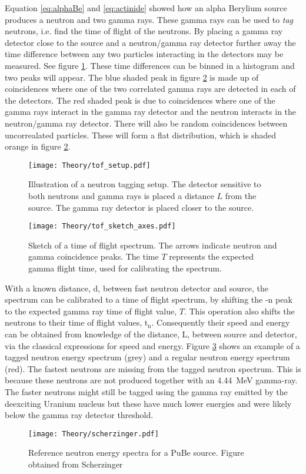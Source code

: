\documentclass[main.tex]{subfiles}
\begin{document}
Equation \ref{eq:alphaBe} and \ref{eq:actinide} showed how an alpha Berylium source produces a neutron and two gamma rays. These gamma rays can be used to \textit{tag} neutrons, i.e. find the time of flight of the neutrons. By placing a gamma ray detector close to the source and a neutron/gamma ray detector further away the time difference between any two particles interacting in the detectors may be measured. See figure \ref{fig:tof_setup}. These time differences can be binned in a histogram and two peaks will appear. The blue shaded peak in figure \ref{fig:tof_sketch} is made up of coincidences where one of the two correlated gamma rays are detected in each of the detectors. The red shaded peak is due to coincidences where one of the gamma rays interact in the gamma ray detector and the neutron interacts in the neutron/gamma ray detector. There will also be random coincidences between uncorrealated particles. These will form a flat distribution, which is shaded orange in figure \ref{fig:tof_sketch}.
\begin{figure}[t]
    \centering
        \texttt{[image: Theory/tof\_setup.pdf]}
        \caption[Illustration of a neutron tagging setup]{Illustration of a neutron tagging setup. The detector sensitive to both neutrons and gamma rays is placed a distance $L$ from the source. The gamma ray detector is placed closer to the source.}
    \label{fig:tof_setup} 
\end{figure}

\begin{figure}[t]
    \centering
        \texttt{[image: Theory/tof\_sketch\_axes.pdf]}
        \caption[Sketch of a time of flight spectrum.]{Sketch of a time of flight spectrum. The arrows indicate neutron and gamma coincidence peaks. The time $T$ represents the expected gamma flight time, used for calibrating the spectrum.}
    \label{fig:tof_sketch} 
\end{figure}

With a known distance, d, between fast neutron detector and source, the spectrum can be calibrated to a time of flight spectrum, by shifting the \textgamma-n peak to the expected gamma ray time of flight value, $T$. This operation also shifts the neutrons to their time of flight values, t$_\text{n}$. Consequently their speed and energy can be obtained from knowledge of the distance, L, between source and detector, via the classical expressions for speed and energy. Figure \ref{fig:scherzinger} shows an example of a tagged neutron energy spectrum (grey) and a regular neutron energy spectrum (red). The fastest neutrons are missing from the tagged neutron spectrum. This is because these neutrons are not produced together with an \SI{4.44}{\MeV} gamma-ray. The faster neutrons might still be tagged using the gamma ray emitted by the deexciting Uranium nucleus but these have much lower energies and were likely below the gamma ray detector threshold.
\begin{figure}[t]
    \centering
        \texttt{[image: Theory/scherzinger.pdf]}
        \caption[Reference neutron energy spectrum]{Reference neutron energy spectra for a PuBe source. Figure obtained from Scherzinger\cite{ScherzingerPhd}}
    \label{fig:scherzinger} 
\end{figure}
\end{document}

